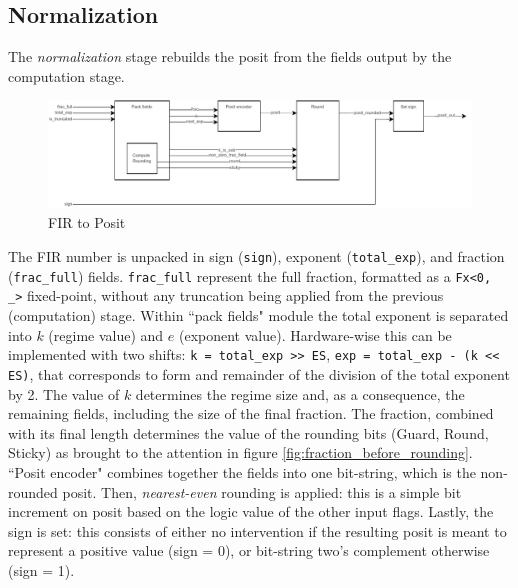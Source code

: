 \subsection{Normalization}

The \textit{normalization} stage rebuilds the posit from the fields output by the computation stage.



\begin{figure}[h!]
    \begin{center}
    \includegraphics[width=1\textwidth]{figures/fir-to-posit-drawing.drawio.pdf}
    \caption{FIR to Posit}
    \label{fig:fir2posit_ppu}
    \end{center}
\end{figure}

The FIR number is unpacked in sign (\texttt{sign}), exponent (\texttt{total\_exp}), and fraction (\texttt{frac\_full}) fields.
\texttt{frac\_full} represent the full fraction, formatted as a \texttt{Fx<0, \_>} fixed-point, without any truncation being applied from the previous (computation) stage.
Within ``pack fields" module the total exponent is separated into $k$ (regime value) and $e$ (exponent value). Hardware-wise this can be implemented with two shifts: \texttt{k = total\_exp >> ES}, \texttt{exp = total\_exp - (k << ES)}, that corresponds to form and remainder of the division of the total exponent by 2.
The value of $k$ determines the regime size and, as a consequence, the remaining fields, including the size of the final fraction. 
The fraction, combined with its final length determines the value of the rounding bits (Guard, Round, Sticky) as brought to the attention in figure \ref{fig:fraction_before_rounding}.
``Posit encoder" combines together the fields into one bit-string, which is the non-rounded posit.
Then, \textit{nearest-even} rounding is applied: this is a simple bit increment on posit based on the logic value of the other input flags.
Lastly, the sign is set: this consists of either no intervention if the resulting posit is meant to represent a positive value (sign = 0), or bit-string two's complement otherwise (sign = 1).



